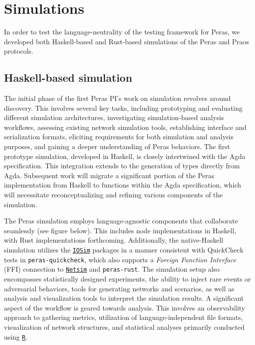 \documentclass[10pt]{article}
\begin{document}
\section{Simulations}\label{simulations}

In order to test the language-neutrality of the testing framework for
Peras, we developed both Haskell-based and Rust-based simulations of the
Peras and Praos protocols.

\subsection{Haskell-based simulation}\label{haskell-based-simulation}

The initial phase of the first Peras PI's work on simulation revolves
around discovery. This involves several key tasks, including prototyping
and evaluating different simulation architectures, investigating
simulation-based analysis workflows, assessing existing network
simulation tools, establishing interface and serialization formats,
eliciting requirements for both simulation and analysis purposes, and
gaining a deeper understanding of Peras behaviors. The first prototype
simulation, developed in Haskell, is closely intertwined with the Agda
specification. This integration extends to the generation of types
directly from Agda. Subsequent work will migrate a significant portion
of the Peras implementation from Haskell to functions within the Agda
specification, which will necessitate reconceptualizing and refining
various components of the simulation.

The Peras simulation employs language-agnostic components that
collaborate seamlessly (see figure below). This includes node
implementations in Haskell, with Rust implementations forthcoming.
Additionally, the native-Haskell simulation utilizes the
\href{https://hackage.haskell.org/package/io-classes}{\color{blue}\texttt{IOSim}} packages in
a manner consistent with QuickCheck tests in \texttt{peras-quickcheck},
which also supports a \emph{Foreign Function Interface} (FFI) connection
to \href{https://github.com/input-output-hk/ce-netsim}{\color{blue}\texttt{Netsim}} and
\texttt{peras-rust}. The simulation setup also encompasses statistically
designed experiments, the ability to inject rare events or adversarial
behaviors, tools for generating networks and scenarios, as well as
analysis and visualization tools to interpret the simulation results. A
significant aspect of the workflow is geared towards analysis. This
involves an observability approach to gathering metrics, utilization of
language-independent file formats, visualization of network structures,
and statistical analyses primarily conducted using
\href{https://www.r-project.org/}{\color{blue}\texttt{R}}.
\end{document}
